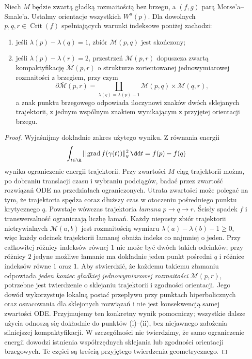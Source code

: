 \begin{twierdzenie}
\label{thm:morse-compact-v10}
Niech $M$ będzie zwartą gładką rozmaitością
bez brzegu, a $(f,g)$ parą Morse'a--Smale'a.
Ustalmy orientacje wszystkich $W^u(p)$.
Dla dowolnych $p,q,r\in\operatorname{Crit}(f)$
spełniających warunki indeksowe poniżej zachodzi:
\begin{enumerate}[label=(\roman*)]
\item jeśli $\lambda(p)-\lambda(q)=1$, zbiór $\mathcal M(p,q)$
      jest skończony;
\item jeśli $\lambda(p)-\lambda(r)=2$, przestrzeń
      $\mathcal M(p,r)$ dopuszcza zwartą kompaktyfikację
      $\overline{\mathcal M}(p,r)$ o strukturze zorientowanej
      jednowymiarowej rozmaitości z brzegiem, przy czym
      \[
       \partial\overline{\mathcal M}(p,r)=
       \coprod_{\lambda(q)=\lambda(p)-1}
       \mathcal M(p,q)\times\mathcal M(q,r),
      \]
      a znak punktu brzegowego odpowiada iloczynowi znaków
      dwóch sklejanych trajektorii, z jednym wspólnym znakiem
      wynikającym z przyjętej orientacji brzegu.
\end{enumerate}
\end{twierdzenie}
\begin{proof}
Wyjaśnijmy dokładnie zakres użytego wyniku. Z równania energii
\[
\int_{t\in\R}\|\operatorname{grad}f(\gamma(t))\|_g^2\,\dd t
=f(p)-f(q)
\]
wynika ograniczenie energii trajektorii.
Przy zwartości $M$ ciąg trajektorii można, po dobraniu translacji
czasu i wybraniu podciągów, badać przez zwartość rozwiązań ODE
na przedziałach ograniczonych. Utrata zwartości może polegać na tym,
że trajektoria spędza coraz dłuższy czas w otoczeniu pośredniego
punktu krytycznego $q$. Powstaje wówczas trajektoria
\emph{łamana} $p\to q\to r$. Ścisły spadek $f$ i transwersalność ograniczają
liczbę łamań. Każdy niepusty zbiór trajektorii
nietrywialnych $\mathcal M(a,b)$ jest rozmaitością
wymiaru $\lambda(a)-\lambda(b)-1\ge0$,
więc każdy odcinek trajektorii łamanej obniża indeks
co najmniej o jeden. Przy całkowitej różnicy indeksów
równej $1$ nie może być dwóch takich odcinków;
przy różnicy $2$ jedyne możliwe łamanie ma
dokładnie jeden punkt pośredni $q$ i różnice
indeksów równe $1$ oraz $1$.
Aby stwierdzić, że każdemu takiemu złamaniu odpowiada
\emph{jeden koniec gładkiej jednowymiarowej rozmaitości}
$\mathcal M(p,r)$, potrzebne jest twierdzenie o sklejaniu
trajektorii i zgodności orientacji. Jego dowód wykorzystuje
lokalną postać przepływu przy punktach hiperbolicznych
oraz oszacowania dla sklejonych rozwiązań i nie jest
konsekwencją samej zwartości ODE. Przyjmujemy ten
konkretny wynik pomocniczy; wszystkie dalsze użycia
odnoszą się dokładnie do punktów (i)--(ii), bez
niejawnego założenia silniejszej kompaktyfikacji.
W szczególności nie twierdzimy, że samo ograniczenie energii
dowodzi istnienia współrzędnych sklejania lub zgodności
orientacji brzegowych. Te części są treścią przyjętego
twierdzenia geometrycznego.
\end{proof}


